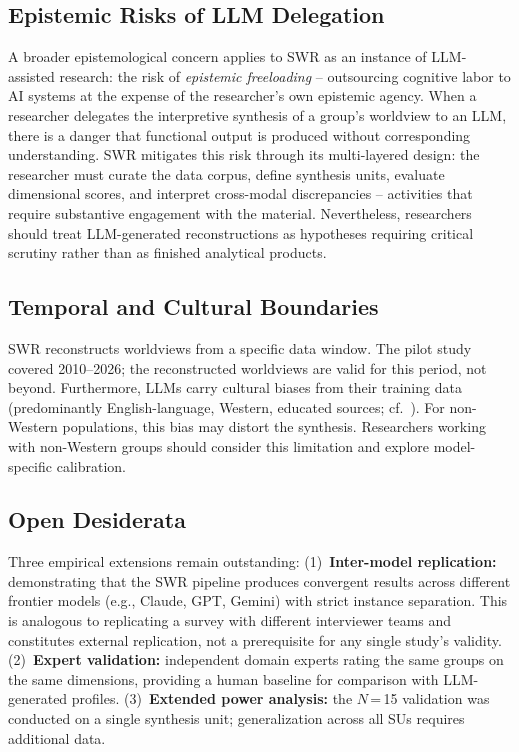 \documentclass[11pt,a4paper]{article}
\begin{document}
\subsection{Epistemic Risks of LLM Delegation}
\label{sec:limitations:epistemic}

A broader epistemological concern applies to SWR as an instance of LLM-assisted research: the risk of \emph{epistemic freeloading} -- outsourcing cognitive labor to AI systems at the expense of the researcher's own epistemic agency. When a researcher delegates the interpretive synthesis of a group's worldview to an LLM, there is a danger that functional output is produced without corresponding understanding. SWR mitigates this risk through its multi-layered design: the researcher must curate the data corpus, define synthesis units, evaluate dimensional scores, and interpret cross-modal discrepancies -- activities that require substantive engagement with the material. Nevertheless, researchers should treat LLM-generated reconstructions as hypotheses requiring critical scrutiny rather than as finished analytical products.


\subsection{Temporal and Cultural Boundaries}
\label{sec:limitations:temporal}

SWR reconstructs worldviews from a specific data window. The pilot study covered 2010--2026; the reconstructed worldviews are valid for this period, not beyond. Furthermore, LLMs carry cultural biases from their training data (predominantly English-language, Western, educated sources; cf.\ \citealp{Santurkar2023}). For non-Western populations, this bias may distort the synthesis. Researchers working with non-Western groups should consider this limitation and explore model-specific calibration.


\subsection{Open Desiderata}
\label{sec:limitations:desiderata}

Three empirical extensions remain outstanding: (1)~\textbf{Inter-model replication:} demonstrating that the SWR pipeline produces convergent results across different frontier models (e.g., Claude, GPT, Gemini) with strict instance separation. This is analogous to replicating a survey with different interviewer teams and constitutes external replication, not a prerequisite for any single study's validity. (2)~\textbf{Expert validation:} independent domain experts rating the same groups on the same dimensions, providing a human baseline for comparison with LLM-generated profiles. (3)~\textbf{Extended power analysis:} the $N$\,=\,15 validation was conducted on a single synthesis unit; generalization across all SUs requires additional data.
\end{document}
